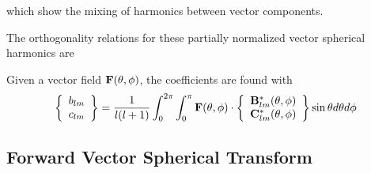 which show the mixing of harmonics between vector components.



The orthogonality relations for these partially normalized vector spherical harmonics are 

Given a vector field $\mathbf{F}(\theta,\phi)$, the coefficients are found with
\begin{equation}
\left\{
\begin{array}{c}
b_{lm} \\
c_{lm} \\
\end{array}
\right\}
=
\dfrac{1}{l(l+1)}\int_0^{2\pi} \int_0^{\pi}
\mathbf{F}(\theta,\phi) \cdot 
\left\{\begin{array}{c}
\mathbf{B}^*_{lm}(\theta,\phi) \\
\mathbf{C}^*_{lm}(\theta,\phi) 
\end{array}\right\}
\sin\theta d\theta d\phi \label{vecanalysis}
\end{equation}


\subsection{Forward Vector Spherical Transform}

